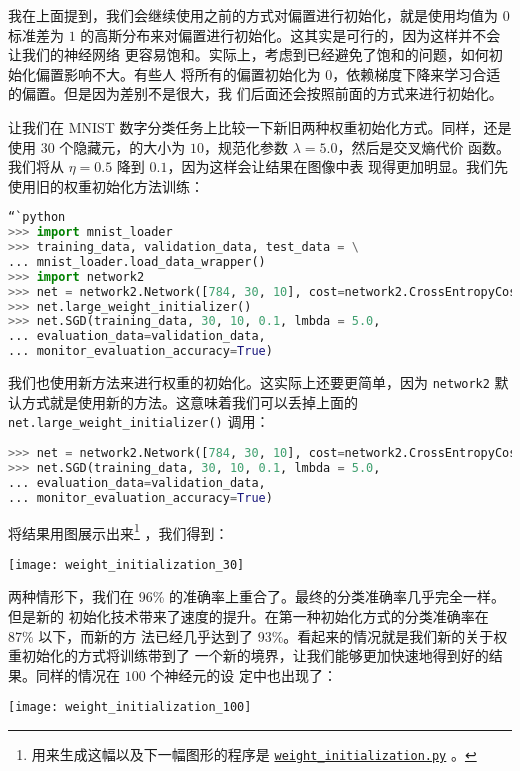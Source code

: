 我在上面提到，我们会继续使用之前的方式对偏置进行初始化，就是使用均值为 $0$ 标准差为
$1$ 的高斯分布来对偏置进行初始化。这其实是可行的，因为这样并不会让我们的神经网络
更容易饱和。实际上，考虑到已经避免了饱和的问题，如何初始化偏置影响不大。有些人
将所有的偏置初始化为 $0$，依赖梯度下降来学习合适的偏置。但是因为差别不是很大，我
们后面还会按照前面的方式来进行初始化。

让我们在 MNIST 数字分类任务上比较一下新旧两种权重初始化方式。同样，还是使用 $30$
个隐藏元，\minibatch 的大小为 $10$，规范化参数 $\lambda = 5.0$，然后是交叉熵代价
函数。我们将\learningrate{}从 $\eta=0.5$ 降到 $0.1$，因为这样会让结果在图像中表
现得更加明显。我们先使用旧的权重初始化方法训练：

\begin{lstlisting}[language=Python]
“`python
>>> import mnist_loader
>>> training_data, validation_data, test_data = \
... mnist_loader.load_data_wrapper()
>>> import network2
>>> net = network2.Network([784, 30, 10], cost=network2.CrossEntropyCost)
>>> net.large_weight_initializer()
>>> net.SGD(training_data, 30, 10, 0.1, lmbda = 5.0,
... evaluation_data=validation_data,
... monitor_evaluation_accuracy=True)
\end{lstlisting}

我们也使用新方法来进行权重的初始化。这实际上还要更简单，因为
\lstinline!network2! 默认方式就是使用新的方法。这意味着我们可以丢掉上面的
\lstinline!net.large_weight_initializer()! 调用：

\begin{lstlisting}[language=Python]
>>> net = network2.Network([784, 30, 10], cost=network2.CrossEntropyCost)
>>> net.SGD(training_data, 30, 10, 0.1, lmbda = 5.0,
... evaluation_data=validation_data,
... monitor_evaluation_accuracy=True)
\end{lstlisting}

将结果用图展示出来\footnote{用来生成这幅以及下一幅图形的程序是
  \href{https://github.com/mnielsen/neural-networks-and-deep-learning/blob/master/fig/weight_initialization.py}{\lstinline!weight_initialization.py!}
  。} ，我们得到：
\begin{center}
    \texttt{[image: weight\_initialization\_30]}
\end{center}

两种情形下，我们在 96\% 的准确率上重合了。最终的分类准确率几乎完全一样。但是新的
初始化技术带来了速度的提升。在第一种初始化方式的分类准确率在 87\% 以下，而新的方
法已经几乎达到了 93\%。看起来的情况就是我们新的关于权重初始化的方式将训练带到了
一个新的境界，让我们能够更加快速地得到好的结果。同样的情况在 $100$ 个神经元的设
定中也出现了：
\begin{center}
    \texttt{[image: weight\_initialization\_100]}
\end{center}


